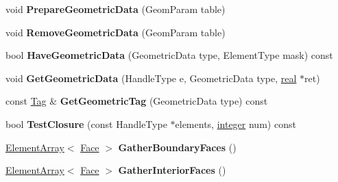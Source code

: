 \begin{DoxyCompactItemize}
\item 
\hypertarget{classINMOST_1_1Mesh_af4ff8ea3298e7ff39ccffdaaa1ebef58}{void {\bfseries Prepare\-Geometric\-Data} (Geom\-Param table)}\label{classINMOST_1_1Mesh_af4ff8ea3298e7ff39ccffdaaa1ebef58}

\item 
\hypertarget{classINMOST_1_1Mesh_a04aaadf5c297568d18cd9a23df11535a}{void {\bfseries Remove\-Geometric\-Data} (Geom\-Param table)}\label{classINMOST_1_1Mesh_a04aaadf5c297568d18cd9a23df11535a}

\item 
\hypertarget{classINMOST_1_1Mesh_a10797f897575540e8f44e4ca9482dbc0}{bool {\bfseries Have\-Geometric\-Data} (Geometric\-Data type, Element\-Type mask) const }\label{classINMOST_1_1Mesh_a10797f897575540e8f44e4ca9482dbc0}

\item 
\hypertarget{classINMOST_1_1Mesh_a3baaeba7978ddf3449399428e8d4e11a}{void {\bfseries Get\-Geometric\-Data} (Handle\-Type e, Geometric\-Data type, \hyperlink{classINMOST_1_1Storage_a853346784b4a5822a7fac54d8f10f805}{real} $\ast$ret)}\label{classINMOST_1_1Mesh_a3baaeba7978ddf3449399428e8d4e11a}

\item 
\hypertarget{classINMOST_1_1Mesh_a82b06fc7b7cfe675c5170e839a3b4734}{const \hyperlink{classINMOST_1_1Tag}{Tag} \& {\bfseries Get\-Geometric\-Tag} (Geometric\-Data type) const }\label{classINMOST_1_1Mesh_a82b06fc7b7cfe675c5170e839a3b4734}

\item 
\hypertarget{classINMOST_1_1Mesh_aeb643b1cad35149e667357beb4c24fa9}{bool {\bfseries Test\-Closure} (const Handle\-Type $\ast$elements, \hyperlink{classINMOST_1_1Storage_aec96942bc647417a801e2895b45964d2}{integer} num) const }\label{classINMOST_1_1Mesh_aeb643b1cad35149e667357beb4c24fa9}

\item 
\hypertarget{classINMOST_1_1Mesh_a8fe976b702bcc86662c1551df5ed26a8}{\hyperlink{classINMOST_1_1ElementArray}{Element\-Array}$<$ \hyperlink{classINMOST_1_1Face}{Face} $>$ {\bfseries Gather\-Boundary\-Faces} ()}\label{classINMOST_1_1Mesh_a8fe976b702bcc86662c1551df5ed26a8}

\item 
\hypertarget{classINMOST_1_1Mesh_a89a1985acd5676d83a8f5d9aa6b0e927}{\hyperlink{classINMOST_1_1ElementArray}{Element\-Array}$<$ \hyperlink{classINMOST_1_1Face}{Face} $>$ {\bfseries Gather\-Interior\-Faces} ()}\label{classINMOST_1_1Mesh_a89a1985acd5676d83a8f5d9aa6b0e927}


\end{DoxyCompactItemize}
